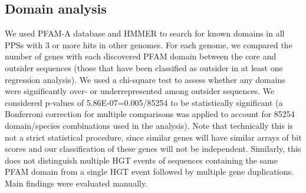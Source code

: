 \subsection{Domain analysis}
\label{domain_analysis}
We used PFAM-A \cite{Finn2014} database and HMMER \cite{Prakash2017} to search
for known domains in all PPSs with 3 or more hits in other genomes. For each
genome, we compared the number of genes with each discovered PFAM domain
between the core and outsider sequences (those that have been classified as
outsider in at least one regression analysis). We used a chi-square test to
assess whether any domains were significantly over- or underrepresented among
outsider sequences. We considered p-values of 5.86E-07=0.005/85254 to be
statistically significant (a Bonferroni correction for multiple comparisons was
applied to account for 85254 domain/species combinations used in the analysis).
Note that technically this is not a strict statistical procedure, since similar
genes will have similar arrays of bit scores and our classification of these
genes will not be independent. Similarly, this does not distinguish multiple
HGT events of sequences containing the same PFAM domain from a single HGT event
followed by multiple gene duplications. Main findings were evaluated manually.
